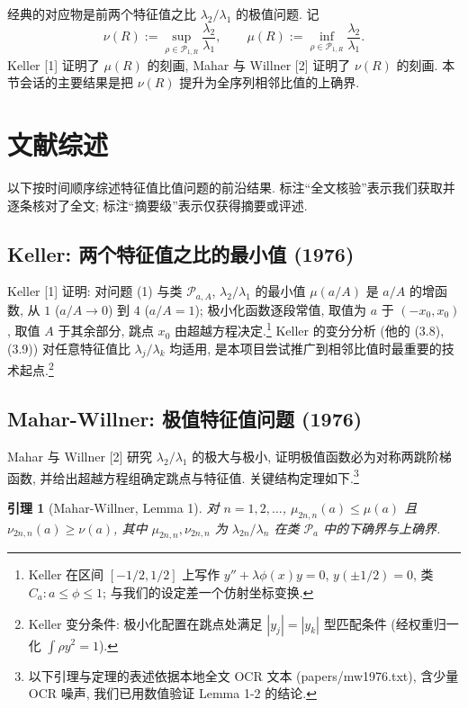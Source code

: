 \documentclass[UTF8]{ctexart}
\newtheorem{lemma}[theorem]{引理}
\begin{document}
经典的对应物是前两个特征值之比 $\lambda_2/\lambda_1$ 的极值问题.
记
\begin{equation}
	\nu(R) := \sup_{\rho \in \mathcal{P}_{1,R}} \frac{\lambda_2}{\lambda_1},
	\qquad
	\mu(R) := \inf_{\rho \in \mathcal{P}_{1,R}} \frac{\lambda_2}{\lambda_1}.
\end{equation}
Keller [1] 证明了 $\mu(R)$ 的刻画, Mahar 与 Willner [2] 证明了 $\nu(R)$ 的刻画.
本节会话的主要结果是把 $\nu(R)$ 提升为全序列相邻比值的上确界.

\section{文献综述}

以下按时间顺序综述特征值比值问题的前沿结果. 标注``全文核验''表示我们获取并逐条核对了全文; 标注``摘要级''表示仅获得摘要或评述.

\subsection{Keller: 两个特征值之比的最小值 (1976)}

Keller [1] 证明: 对问题 (1) 与类 $\mathcal{P}_{a,A}$,
$\lambda_2/\lambda_1$ 的最小值 $\mu(a/A)$ 是 $a/A$ 的增函数, 从 $1$ ($a/A \to 0$) 到 $4$ ($a/A = 1$);
极小化函数逐段常值, 取值为 $a$ 于 $(-x_0, x_0)$, 取值 $A$ 于其余部分,
跳点 $x_0$ 由超越方程决定.\footnote{Keller 在区间 $[-1/2, 1/2]$ 上写作 $y'' + \lambda\phi(x)y = 0$, $y(\pm 1/2) = 0$, 类 $C_a: a \leq \phi \leq 1$; 与我们的设定差一个仿射坐标变换.}
Keller 的变分分析 (他的 (3.8), (3.9)) 对任意特征值比 $\lambda_j/\lambda_k$ 均适用,
是本项目尝试推广到相邻比值时最重要的技术起点.\footnote{Keller 变分条件: 极小化配置在跳点处满足 $|y_j| = |y_k|$ 型匹配条件 (经权重归一化 $\int \rho y^2 = 1$).}

\subsection{Mahar-Willner: 极值特征值问题 (1976)}

Mahar 与 Willner [2] 研究 $\lambda_2/\lambda_1$ 的极大与极小, 证明极值函数必为对称两跳阶梯函数, 并给出超越方程组确定跳点与特征值. 关键结构定理如下.\footnote{以下引理与定理的表述依据本地全文 OCR 文本 (papers/mw1976.txt), 含少量 OCR 噪声, 我们已用数值验证 Lemma 1-2 的结论.}

\begin{lemma}[Mahar-Willner, Lemma 1]
对 $n = 1, 2, \dots$, $\mu_{2n,n}(a) \leq \mu(a)$ 且 $\nu_{2n,n}(a) \geq \nu(a)$,
其中 $\mu_{2n,n}, \nu_{2n,n}$ 为 $\lambda_{2n}/\lambda_n$ 在类 $\mathcal{P}_a$ 中的下确界与上确界.
\end{lemma}
\end{document}
